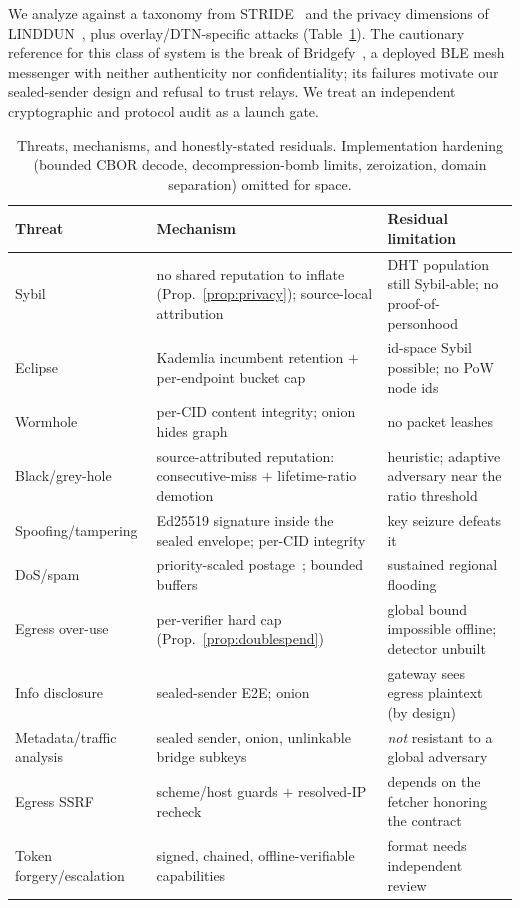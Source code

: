 \documentclass[11pt]{article}
\begin{document}
We analyze against a taxonomy from STRIDE~\cite{shostack2014threatmodeling} and
the privacy dimensions of LINDDUN~\cite{deng2011linddun}, plus overlay/DTN-specific
attacks (Table~\ref{tab:threats}). The cautionary reference for this class of
system is the break of Bridgefy~\cite{albrecht2021bridgefy}, a deployed BLE mesh
messenger with neither authenticity nor confidentiality; its failures motivate our
sealed-sender design and refusal to trust relays. We treat an independent
cryptographic and protocol audit as a launch gate.

\begin{table}[t]\centering\small
\begin{tabular}{@{}p{3.0cm}p{6.0cm}p{4.1cm}@{}}
\toprule
\textbf{Threat} & \textbf{Mechanism} & \textbf{Residual limitation}\\
\midrule
Sybil~\cite{douceur2002sybil} & no shared reputation to inflate (Prop.~\ref{prop:privacy}); source-local attribution & DHT population still Sybil-able; no proof-of-personhood\\
Eclipse~\cite{singh2006eclipse,heilman2015eclipse} & Kademlia incumbent retention $+$ per-endpoint bucket cap & id-space Sybil possible; no PoW node ids\\
Wormhole~\cite{hu2003leashes} & per-CID content integrity; onion hides graph & no packet leashes\\
Black/grey-hole & source-attributed reputation: consecutive-miss $+$ lifetime-ratio demotion & heuristic; adaptive adversary near the ratio threshold\\
Spoofing/tampering & Ed25519 signature inside the sealed envelope; per-CID integrity & key seizure defeats it\\
DoS/spam & priority-scaled postage~\cite{back2002hashcash}; bounded buffers & sustained regional flooding\\
Egress over-use & per-verifier hard cap (Prop.~\ref{prop:doublespend}) & global bound impossible offline; detector unbuilt\\
Info disclosure & sealed-sender E2E; onion & gateway sees egress plaintext (by design)\\
Metadata/traffic analysis & sealed sender, onion, unlinkable bridge subkeys & \emph{not} resistant to a global adversary\\
Egress SSRF & scheme/host guards $+$ resolved-IP recheck~\cite{owasp_ssrf} & depends on the fetcher honoring the contract\\
Token forgery/escalation & signed, chained, offline-verifiable capabilities & format needs independent review\\
\bottomrule
\end{tabular}
\caption{Threats, mechanisms, and honestly-stated residuals. Implementation
hardening (bounded CBOR decode, decompression-bomb limits, zeroization, domain
separation) omitted for space.}
\label{tab:threats}
\end{table}
\end{document}
